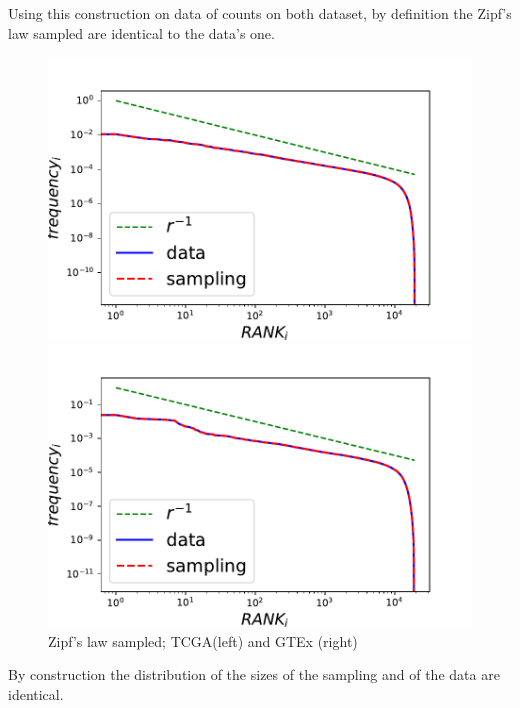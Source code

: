Using this construction on data of counts on both dataset, by definition the Zipf's law sampled are identical to the data's one.
\begin{figure}[htb!]
\begin{minipage}{0.5\textwidth}
    \centering
    \includegraphics[width=0.95\linewidth]{pictures/structure/tcga/globalzipf_null.pdf}
\end{minipage}
\hspace{2mm}
\begin{minipage}{0.5\textwidth}
    \centering
    \includegraphics[width=0.95\linewidth]{pictures/structure/gtex/globalzipf_null.pdf}
\end{minipage}
\caption{Zipf's law sampled; TCGA(left) and GTEx (right)}
\label{fig:structure/globalzipf_null}
\end{figure}
By construction the distribution of the sizes of the sampling and of the data are identical.

